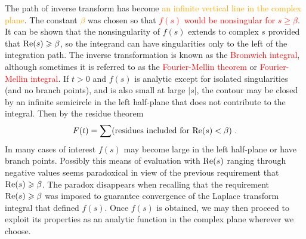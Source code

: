 \documentclass[12pt,a4paper]{article}
\newcounter{theo}[section]\setcounter{theo}{0}
\begin{document}
The path of inverse transform has become \textcolor{orange}{an infinite vertical line in the complex plane}. The constant \textcolor{orange}{$\beta$} was chosen so that \textcolor{red}{$f(s)$ would be nonsingular for $s \geqslant \beta$}. It can be shown that the nonsingularity of $f(s)$ extends to complex $s$ provided that ${\rm Re}(s) \geqslant \beta$, so the integrand can have singularities only to the left of the integration path. The inverse transformation is known as the \textcolor{red}{Bromwich integral}, although sometimes it is referred to as the \textcolor{red}{Fourier-Mellin theorem} or \textcolor{red}{Fourier-Mellin integral}. If $t > 0$ and $f(s)$ is analytic except for isolated singularities (and no branch points), and is also small at large $|s|$, the contour may be closed by an infinite semicircle in the left half-plane that does not contribute to the integral. Then by the residue theorem
\begin{equation}
F(t) = \sum (\text{residues included for} ~{\rm Re}(s) < \beta) ~.
\end{equation}
In many cases of interest $f(s)$ may become large in the left half-plane or have branch points. Possibly this means of evaluation with ${\rm Re}(s)$ ranging through negative values seems paradoxical in view of the previous requirement that ${\rm Re}(s) \geqslant \beta$. The paradox disappears when recalling that the requirement ${\rm Re}(s) \geqslant \beta$ was imposed to guarantee convergence of the Laplace transform integral that defined $f(s)$. Once $f(s)$ is obtained, we may then proceed to exploit its properties as an analytic function in the complex plane wherever we choose.
\end{document}
